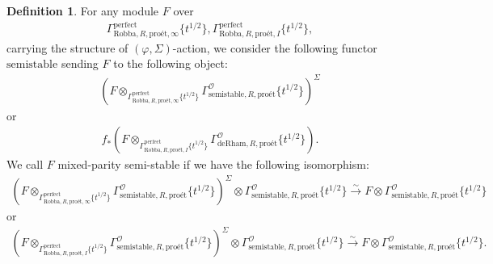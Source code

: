 \documentclass[12pt]{book}
\theoremstyle{definition}
\newtheorem{definition}{Definition}
\begin{document}
\begin{definition}
For any module $F$ over 
\begin{align}
\Gamma^\mathrm{perfect}_{\text{Robba},R,\text{pro\'et},\infty}\{t^{1/2}\},\Gamma^\mathrm{perfect}_{\text{Robba},R,\text{pro\'et},I}\{t^{1/2}\},
\end{align} 
carrying the structure of $(\varphi,\Sigma)$-action, we consider the following functor $\mathrm{semistable}$ sending $F$ to the following object:
\begin{align}
(F\otimes_{\Gamma^\mathrm{perfect}_{\text{Robba},R,\text{pro\'et},\infty}\{t^{1/2}\}} \Gamma^\mathcal{O}_{\text{semistable},R,\text{pro\'et}}\{t^{1/2}\})^\Sigma
\end{align}
or 
\begin{align}
f_*(F\otimes_{\Gamma^\mathrm{perfect}_{\text{Robba},R,\text{pro\'et},I}\{t^{1/2}\}} \Gamma^\mathcal{O}_{\text{deRham},R,\text{pro\'et}}\{t^{1/2}\}).
\end{align}
We call $F$ mixed-parity semi-stable if we have the following isomorphism:
\begin{align}
(F\otimes_{\Gamma^\mathrm{perfect}_{\text{Robba},R,\text{pro\'et},\infty}\{t^{1/2}\}} \Gamma^\mathcal{O}_{\text{semistable},R,\text{pro\'et}}\{t^{1/2}\})^\Sigma \otimes \Gamma^\mathcal{O}_{\text{semistable},R,\text{pro\'et}}\{t^{1/2}\} \overset{\sim}{\longrightarrow} F \otimes \Gamma^\mathcal{O}_{\text{semistable},R,\text{pro\'et}}\{t^{1/2}\} 
\end{align}
or 
\begin{align}
(F\otimes_{\Gamma^\mathrm{perfect}_{\text{Robba},R,\text{pro\'et},I}\{t^{1/2}\}} \Gamma^\mathcal{O}_{\text{semistable},R,\text{pro\'et}}\{t^{1/2}\})^\Sigma \otimes \Gamma^\mathcal{O}_{\text{semistable},R,\text{pro\'et}}\{t^{1/2}\} \overset{\sim}{\longrightarrow} F \otimes \Gamma^\mathcal{O}_{\text{semistable},R,\text{pro\'et}}\{t^{1/2}\}. 
\end{align}
\end{definition}
\end{document}
